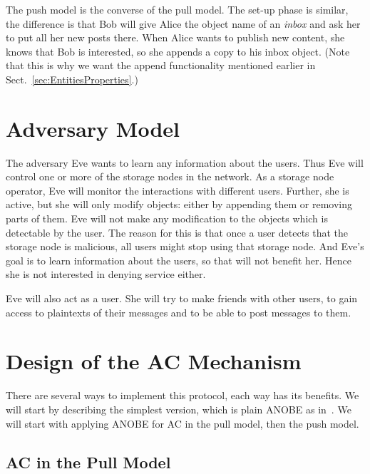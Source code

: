 The push model is the converse of the pull model.
The set-up phase is similar, the difference is that Bob will give Alice the 
object name of an \emph{inbox} and ask her to put all her new posts there.
When Alice wants to publish new content, she knows that Bob is interested, so 
she appends a copy to his inbox object.
(Note that this is why we want the append functionality mentioned earlier in 
Sect.~\ref{sec:EntitiesProperties}.)


\section{Adversary Model}\label{sec:Adversary}

The adversary Eve wants to learn any information about the users.
Thus Eve will control one or more of the storage nodes in the network.
As a storage node operator, Eve will monitor the interactions with different 
users.
Further, she is active, but she will only modify objects: either by appending 
them or removing parts of them.
Eve will not make any modification to the objects which is detectable by the 
user.
The reason for this is that once a user detects that the storage node is 
malicious, all users might stop using that storage node.
And Eve's goal is to learn information about the users, so that will not 
benefit her.
Hence she is not interested in denying service either.

Eve will also act as a user.
She will try to make friends with other users, to gain access to plaintexts of 
their messages and to be able to post messages to them.


\section{Design of the \acl{AC} Mechanism}\label{sec:Design}

There are several ways to implement this protocol, each way has its benefits.
We will start by describing the simplest version, which is plain \ac{ANOBE} as 
in~\cite{ANOBE}.
We will start with applying \ac{ANOBE} for \ac{AC} in the pull model, then the 
push model.

\subsection{\acl{AC} in the Pull Model}\label{sec:PullModelAC}

